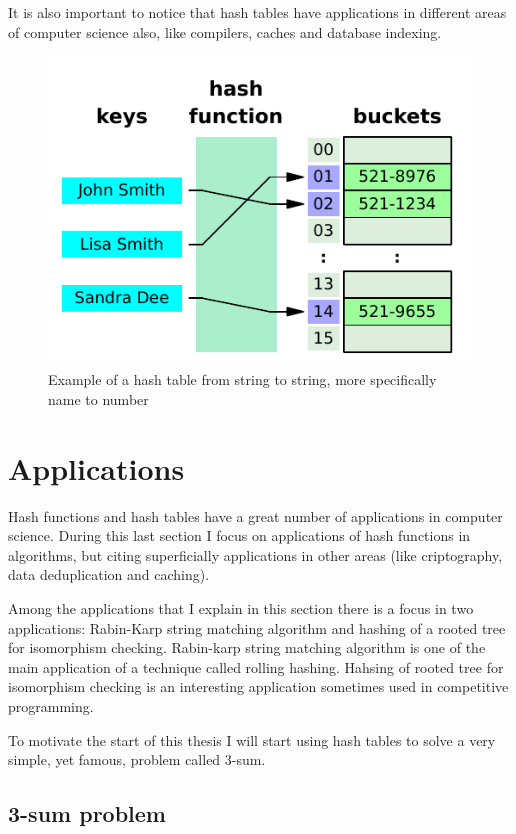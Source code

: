 It is also important to notice that hash tables have applications in different areas of computer science also, like compilers, caches and database indexing.


\begin{figure}[h!]
  \centering
  \includegraphics[width=12cm]{figuras/hash-table.pdf}
  \caption{Example of a hash table from string to string, more specifically name to number}
\end{figure}

\section{Applications}

Hash functions and hash tables have a great number of applications in computer science. During this last section I focus on applications of hash functions in algorithms, but citing superficially applications in other areas (like criptography, data deduplication and caching).

Among the applications that I explain in this section there is a focus in two applications: Rabin-Karp string matching algorithm and hashing of a rooted tree for isomorphism checking. Rabin-karp string matching algorithm is one of the main application of a technique called rolling hashing. Hahsing of rooted tree for isomorphism checking is an interesting application sometimes used in competitive programming.

To motivate the start of this thesis I will start using hash tables to solve a very simple, yet famous, problem called 3-sum.

\subsection{3-sum problem}

